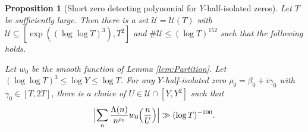 \documentclass[12pt]{amsart}
\theoremstyle{plain}
\newtheorem{proposition}[theorem]{Proposition}
\theoremstyle{definition}
\theoremstyle{remark}
\begin{document}
%
%
%
%
\begin{proposition}[Short zero detecting polynomial for $Y$-half-isolated zeros]\label{prp:HalfIsolated}
Let $T$ be sufficiently large. Then there is a set $\mathcal{U}=\mathcal{U}(T)$ with $\mathcal{U}\subseteq [\exp((\log\log{T})^3),T^2]$ and $\#\mathcal{U}\le (\log{T})^{152}$ such that the following holds.

Let $w_0$ be the smooth function of Lemma \ref{lem:Partition}. Let $(\log \log T)^3 \leq \log Y \leq \log T$. For any $Y$-half-isolated zero $\rho_0=\beta_0+i\gamma_0$ with $\gamma_0\in[T,2T]$, there is a choice of $U\in\mathcal{U} \cap [Y,Y^2]$ such that 
\[
\Bigl|\sum_{n}\frac{\Lambda(n)}{n^{\rho_0}}w_0\Bigl(\frac{n}{U}\Bigr)\Bigr|\gg (\log{T})^{-100}.
\]
\end{proposition}
%
%
%
%
\end{document}
